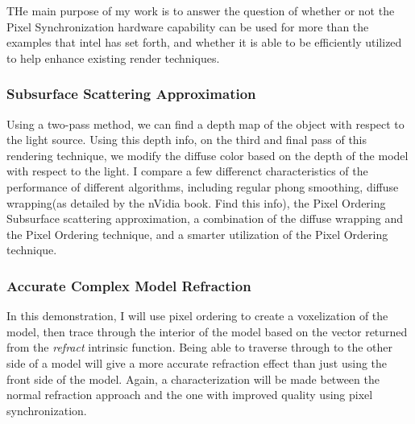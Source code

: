 \documentclass{article}
\begin{document}
\begin{multicols*}{2}
THe main purpose of my work is to answer the question of whether or not the
Pixel Synchronization hardware capability can be used for more than the
examples that intel has set forth, and whether it is able to be efficiently
utilized to help enhance existing render techniques.

\subsubsection*{\textbf{Subsurface Scattering Approximation}}

Using a two-pass method, we can find a depth map of the object with respect to
the light source. Using this depth info, on the third and final pass of this
rendering technique, we modify the diffuse color based on the depth of the
model with respect to the light. I compare a few differenct characteristics of
the performance of different algorithms, including regular phong smoothing,
diffuse wrapping(as detailed by the nVidia book. Find this info), the Pixel
Ordering Subsurface scattering approximation, a combination of the diffuse
wrapping and the Pixel Ordering technique, and a smarter utilization of the
Pixel Ordering technique.

\subsubsection*{\textbf{Accurate Complex Model Refraction}}

In this demonstration, I will use pixel ordering to create a voxelization of
the model, then trace through the interior of the model based on the vector
returned from the \textit{refract} intrinsic function. Being able to traverse
through to the other side of a model will give a more accurate refraction
effect than just using the front side of the model. Again, a characterization
will be made between the normal refraction approach and the one with improved
quality using pixel synchronization.



\end{multicols*}
\end{document}
